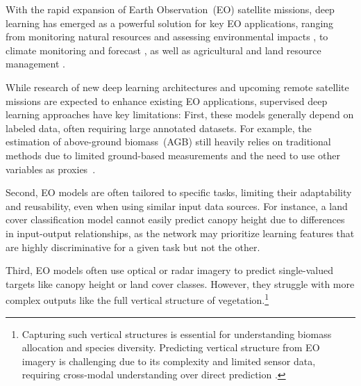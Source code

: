 With the rapid expansion of Earth Observation~(EO) satellite missions, deep learning has emerged as a powerful solution for key EO applications, ranging from monitoring natural resources \cite{Chen_etal_2023, Fayad_etal_2024, Li_etal_2023a, Liu_etal_2022, Pauls_etal_2024, schwartz2023forms} and assessing environmental impacts \cite{Dalagnol_etal_2023, Wagner_etal_2023}, to climate monitoring and forecast \cite{Andrychowicz_etal_2023, Schultz_etal_2021}, as well as agricultural and land resource management \cite{Ienco_etal_2019, Kussul_etal_2017, Zhang_etal_2019}.

While research of new deep learning architectures and upcoming remote satellite missions are expected to enhance existing EO applications, 
supervised deep learning approaches have key limitations: First, these models generally depend on labeled data, often requiring large annotated datasets. For example, the estimation of above-ground biomass~(AGB) still heavily relies on traditional methods due to limited ground-based measurements and the need to use other variables as proxies~\cite{Morin_etal_2023, schwartz2023forms}. 

Second, EO models are often tailored to specific tasks, limiting their adaptability and reusability, even when using similar input data sources. For instance, a land cover classification model cannot easily predict canopy height due to differences in input-output relationships, as the network may prioritize learning features that are highly discriminative for a given task but not the other. 

Third, EO models often use optical or radar imagery to predict single-valued targets like canopy height or land cover classes. However, they struggle with more complex outputs like the full vertical structure of vegetation.\footnote{Capturing such vertical structures is essential for understanding biomass allocation and species diversity. Predicting vertical structure from EO imagery is challenging due to its complexity and limited sensor data, requiring cross-modal understanding over direct prediction \cite{Tan_etal_2024}.}

